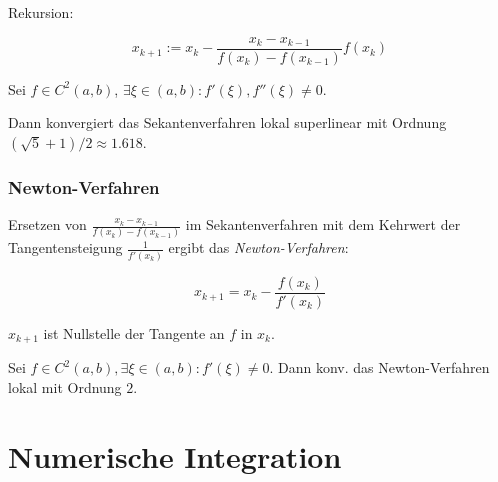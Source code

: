 Rekursion:

\vspace*{-4mm}
$$x_{k+1} := x_k - \frac{x_k-x_{k-1}}{f(x_k)-f(x_{k-1})}f(x_k)$$

\spacing

Sei $f \in C^2(a,b)$, $\exists \xi \in (a,b) : f'(\xi), f''(\xi) \neq 0$.

Dann konvergiert das Sekantenverfahren lokal superlinear mit Ordnung $(\sqrt{5}+1)/2 \approx 1.618$.

\subsubsection*{Newton-Verfahren}

Ersetzen von $\frac{x_k-x_{k-1}}{f(x_k)-f(x_{k-1})}$ im Sekantenverfahren mit dem Kehrwert der Tangentensteigung $\frac{1}{f'(x_k)}$ ergibt das \emph{Newton-Verfahren}:

\vspace*{-2mm}
$$x_{k+1} = x_k - \frac{f(x_k)}{f'(x_k)}$$

$x_{k+1}$ ist Nullstelle der Tangente an $f$ in $x_k$.

\spacing

Sei $f \in C^2(a,b), \exists \xi \in (a,b) : f'(\xi) \neq 0$. Dann konv. das Newton-Verfahren lokal mit Ordnung $2$.

\section*{Numerische Integration}
